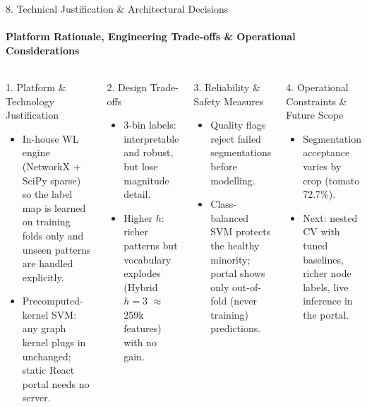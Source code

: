 \documentclass[aspectratio=169, 11pt]{beamer}
\begin{document}
\begin{frame}{8. Technical Justification \& Architectural Decisions}
    \framesubtitle{Platform Rationale, Engineering Trade-offs \& Operational Considerations}
    \begin{columns}[T]
        \begin{block}{1. Platform \& Technology Justification}
            \scriptsize
            \begin{itemize}
                \item In-house WL engine (NetworkX + SciPy sparse) so the label map is learned on training folds only and unseen patterns are handled explicitly.
                \item Precomputed-kernel SVM: any graph kernel plugs in unchanged; static React portal needs no server.
            \end{itemize}
        \end{block}

        \begin{block}{2. Design Trade-offs}
            \scriptsize
            \begin{itemize}
                \item 3-bin labels: interpretable and robust, but lose magnitude detail.
                \item Higher $h$: richer patterns but vocabulary explodes (Hybrid $h=3$ $\approx$ 259k features) with no gain.
            \end{itemize}
        \end{block}

        \begin{block}{3. Reliability \& Safety Measures}
            \scriptsize
            \begin{itemize}
                \item Quality flags reject failed segmentations before modelling.
                \item Class-balanced SVM protects the healthy minority; portal shows only out-of-fold (never training) predictions.
            \end{itemize}
        \end{block}

        \begin{block}{4. Operational Constraints \& Future Scope}
            \scriptsize
            \begin{itemize}
                \item Segmentation acceptance varies by crop (tomato 72.7\%).
                \item Next: nested CV with tuned baselines, richer node labels, live inference in the portal.
            \end{itemize}
        \end{block}
    \end{columns}
\end{frame}
\end{document}
